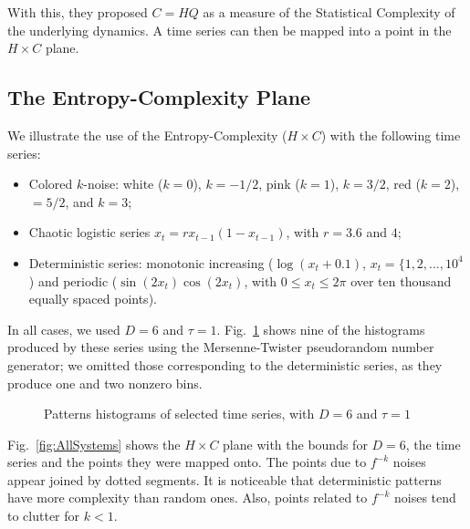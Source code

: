 With this, they proposed $C=HQ$ as a measure of the Statistical Complexity of the underlying dynamics.
A time series can then be mapped into a point in the $H\times C$ plane.


\subsection{The Entropy-Complexity Plane}

We illustrate the use of the Entropy-Complexity ($H\times C$) with the following time series:
\begin{itemize}
\item Colored $k$-noise: white ($k=0$), $k=-1/2$, pink ($k=1$), $k=3/2$, red ($k=2$), $=5/2$, and $k=3$;
\item Chaotic logistic series $x_t = r x_{t-1} (1 - x_{t-1})$, with $r=3.6$ and $4$;
\item Deterministic series: monotonic increasing ($\log(x_t+0.1)$, $x_t=\{1,2,\dots,10^4$) and periodic ($\sin(2x_t)\cos(2x_t)$, with $0\leq x_t\leq 2\pi$ over ten thousand equally spaced points).
\end{itemize}
In all cases, we used $D=6$ and $\tau=1$.
Fig.~\ref{fig:Histograms} shows nine of the histograms produced by these series using the Mersenne-Twister pseudorandom number generator;
we omitted those corresponding to the deterministic series, as they produce one and two nonzero bins.

\begin{figure}[H]
\centering
	\subfloat[Logistic map $r=3.6$]{\texttt{[image: h36]}}\quad
	\subfloat[Logistic map $r=4$]{\texttt{[image: h4]}}\quad
	\subfloat[$f^{-3}$ noise]{\texttt{[image: h3]}}\quad
	\subfloat[$f^{-5/2}$ noise]{\texttt{[image: h25]}}\quad
	\subfloat[$f^{-2}$ noise]{\texttt{[image: h2]}}\quad
	\subfloat[$f^{-1.5}$ noise]{\texttt{[image: h15]}}\quad
	\subfloat[$f^{-1}$ noise]{\texttt{[image: h1]}}\quad
	\subfloat[$f^{-1/2}$ noise]{\texttt{[image: h05]}}\quad
	\caption{Patterns histograms of selected time series, with $D=6$ and $\tau=1$\label{fig:Histograms}}
\end{figure}


Fig.~\ref{fig:AllSystems} shows the $H\times C$ plane with the bounds for $D=6$, the time series and the points they were mapped onto.
The points due to $f^{-k}$ noises appear joined by dotted segments.
It is noticeable that deterministic patterns have more complexity than random ones.
Also, points related to $f^{-k}$ noises tend to clutter for $k<1$.

